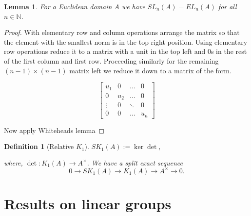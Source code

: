 \documentclass[12pt]{report}
\numberwithin{equation}{section}
\newcommand{\N}{\mathbb{N}}
\newcounter{dummy} \numberwithin{dummy}{section}
\newtheorem{theorem}[dummy]{Theorem}
\newtheorem{definition}[dummy]{Definition}
\newtheorem{lemma}[dummy]{Lemma}
\begin{document}
	\begin{lemma}
		For a Euclidean domain $A$ we have $SL_n(A)=EL_n(A)$ for all $n \in \N$.
	\end{lemma}
	\begin{proof}
		With elementary row and column operations arrange the matrix so that the element with the smallest norm is in the top right position. Using elementary row operations reduce it to a matrix with a unit in the top left and 0s in the rest of the first column and first row. Proceeding similarly for the remaining $(n-1) \times (n-1) $ matrix left we reduce it down to a matrix of the form.
		
		\[ \begin{bmatrix}
			u_1 & 0 & \dots & 0 \\
			0 & u_2 & \dots & 0 \\
			\vdots & 0 & \ddots & 0\\
			0 & 0 & \dots & u_n 
		\end{bmatrix} \]
		
		Now apply Whiteheads lemma 
	\end{proof}
	
	\begin{definition}[Relative $K_1$]
		$SK_1(A):= \ker \det,$
		
		where, $\det : K_1(A) \to A^\times$. We have a split exact sequence
		\[ 0 \to SK_1(A) \to K_1(A) \to A^\times \to 0 .\]
	\end{definition}
	
	
	\chapter{Results on linear groups}
	
\end{document}
